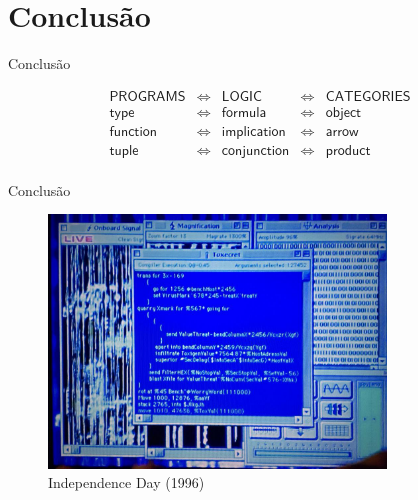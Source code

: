 \documentclass{beamer}
\begin{document}

\section{Conclusão}

\begin{frame}{Conclusão}

\begin{block}{}

\[
\begin{array}{rcccl}
\textsf{PROGRAMS} & \Longleftrightarrow & \textsf{LOGIC} & \Longleftrightarrow & \textsf{CATEGORIES}\\
\textsf{type} & \Longleftrightarrow & \textsf{formula} & \Longleftrightarrow & \textsf{object}\\
\textsf{function} & \Longleftrightarrow & \textsf{implication} & \Longleftrightarrow & \textsf{arrow}\\
\textsf{tuple} & \Longleftrightarrow & \textsf{conjunction} & \Longleftrightarrow & \textsf{product}\\
\end{array}
\]

\end{block}

\end{frame}

\begin{frame}{Conclusão}

\begin{figure}
\centering
\includegraphics[width=0.8\textwidth]{eday.jpg}
\caption{Independence Day (1996)}
\end{figure}

\end{frame}
\end{document}
